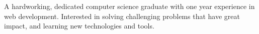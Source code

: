 

\begin{cvparagraph}


A hardworking, dedicated computer science graduate with one year experience in web development. Interested in solving challenging problems that have great impact, and learning new technologies and tools.
\end{cvparagraph}
